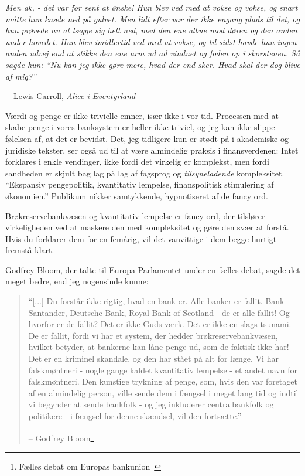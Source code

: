 \documentclass[paper=6in:9in,pagesize=pdftex,headinclude=on,footinclude=on,12pt]{scrbook}
\makeatletter
\newenvironment{chapquote}[2][4em]{\setlength{\@tempdima}{#1}%
   \def\chapquote@author{#2}%
   \parshape 1 \@tempdima \dimexpr\textwidth-2\@tempdima\relax%
   \itshape}{\par\normalfont\hfill--\ \chapquote@author\hspace*{\@tempdima}\par\bigskip}
\makeatother
\begin{document}
\begin{chapquote}{Lewis Carroll, \textit{Alice i Eventyrland}} Men ak, - det var for sent at ønske! Hun blev ved med at vokse og vokse, og snart måtte hun knæle ned på gulvet. Men lidt efter var der ikke engang plads til det, og hun prøvede nu at lægge sig helt ned, med den ene albue mod døren og den anden under hovedet. Hun blev imidlertid ved med at vokse, og til sidst havde hun ingen anden udvej end at stikke den ene arm ud ad vinduet og foden op i skorstenen. Så sagde hun: \enquote{Nu kan jeg ikke gøre mere, hvad der end sker. Hvad skal der dog blive af mig?} \end{chapquote}

Værdi og penge er ikke trivielle emner, især ikke i vor tid. Processen med at skabe penge i vores banksystem er heller ikke triviel, og jeg kan ikke slippe følelsen af, at det er bevidst. Det, jeg tidligere kun er stødt på i akademiske og juridiske tekster, ser også ud til at være almindelig praksis i finansverdenen: Intet forklares i enkle vendinger, ikke fordi det virkelig er komplekst, men fordi sandheden er skjult bag lag på lag af fagsprog og \textit{tilsyneladende} kompleksitet. \enquote{Ekspansiv pengepolitik, kvantitativ lempelse, finanspolitisk stimulering af økonomien.} Publikum nikker samtykkende, hypnotiseret af de fancy ord.

Brøkreservebankvæsen og kvantitativ lempelse er fancy ord, der tilslører virkeligheden ved at maskere den med kompleksitet og gøre den svær at forstå. Hvis du forklarer dem for en femårig, vil det vanvittige i dem begge hurtigt fremstå klart.

Godfrey Bloom, der talte til Europa-Parlamentet under en fælles debat, sagde det meget bedre, end jeg nogensinde kunne:\begin{quotation}\begin{samepage} \enquote{[...] Du forstår ikke rigtig, hvad en bank er. Alle banker er fallit. Bank Santander, Deutsche Bank, Royal Bank of Scotland - de er alle fallit! Og hvorfor er de fallit? Det er ikke Guds værk. Det er ikke en slags tsunami. De er fallit, fordi vi har et system, der hedder brøkreservebankvæsen, hvilket betyder, at bankerne kan låne penge ud, som de faktisk ikke har! Det er en kriminel skandale, og den har stået på alt for længe. \href{...}{} Vi har falskmøntneri - nogle gange kaldet kvantitativ lempelse - et andet navn for falskmøntneri. Den kunstige trykning af penge, som, hvis den var foretaget af en almindelig person, ville sende dem i fængsel i meget lang tid \href{...}{} og indtil vi begynder at sende bankfolk - og jeg inkluderer centralbankfolk og politikere - i fængsel for denne skændsel, vil den fortsætte.} \begin{flushright} -- Godfrey Bloom\footnote{Fælles debat om Europas bankunion~\cite{godfrey-bloom}}
\end{flushright}\end{samepage}\end{quotation}
\end{document}
